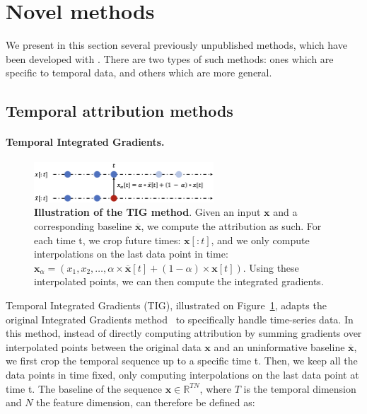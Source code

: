 \section{Novel methods}
\label{sec:methods}

We present in this section several previously unpublished methods, which have been developed
with \texttt{}.
There are two types of such methods: ones which are specific to temporal data, and others which are more general.


\subsection{Temporal attribution methods}
\label{subsec:temporal-attribution-methods}

\paragraph{Temporal Integrated Gradients.}

\begin{figure}[h]
\begin{center}
\centerline{\includegraphics[width=0.6\textwidth]{figures/tig}}
\caption{
    \textbf{Illustration of the TIG method}.
    Given an input $\textbf{x}$ and a corresponding baseline $\overline{\textbf{x}}$, we compute the attribution as such.
    For each time t, we crop future times: $\textbf{x}[:t]$, and we only compute interpolations on the last data point in
    time: $\textbf{x}_{\alpha} = (x_1, x_2, \dots, \alpha \times \overline{\textbf{x}}[t] + (1 - \alpha) \times \textbf{x}[t])$.
    Using these interpolated points, we can then compute the integrated gradients.
}
\label{fig:tig}
\end{center}
\end{figure}

Temporal Integrated Gradients (TIG), illustrated on Figure~\ref{fig:tig}, adapts the original Integrated Gradients
method~\citep{sundararajan2017axiomatic} to specifically handle time-series data.
In this method, instead of directly computing attribution by summing gradients over interpolated points between the
original data $\textbf{x}$ and an uninformative baseline $\overline{\textbf{x}}$, we first crop the temporal sequence up
to a specific time t.
Then, we keep all the data points in time fixed, only computing interpolations on the last data point at time t.
The baseline of the sequence $\textbf{x} \in \mathbb{R}^{TN}$, where $T$ is the temporal dimension and $N$ the
feature dimension, can therefore be defined as:

